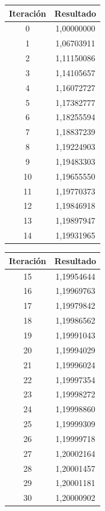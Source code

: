 \documentclass[titlepage,a4paper]{article}
\begin{document}
\begin{multicols}{2}
\begin{center}
    \begin{tabular}{| c | c |}
    \hline
     Iteración & Resultado \\ \hline
        0     & 1,00000000 \\
        1     & 1,06703911 \\
        2     & 1,11150086 \\
        3     & 1,14105657 \\
        4     & 1,16072727 \\
        5     & 1,17382777 \\
        6     & 1,18255594 \\
        7     & 1,18837239 \\
        8     & 1,19224903 \\
        9     & 1,19483303 \\
        10    & 1,19655550 \\
        11    & 1,19770373 \\
        12    & 1,19846918 \\
        13    & 1,19897947 \\
        14    & 1,19931965 \\
        
          \hline
    \end{tabular}
\end{center}
        
    \begin{center}
    \begin{tabular}{| c | c |}
    \hline    
     Iteración & Resultado \\ \hline
     15    & 1,19954644 \\
        16    & 1,19969763 \\
        17    & 1,19979842 \\
        18    & 1,19986562 \\
        19    & 1,19991043 \\
        20    & 1,19994029 \\
        21    & 1,19996024 \\
        22    & 1,19997354 \\
        23    & 1,19998272 \\
        24    & 1,19998860 \\
        25    & 1,19999309 \\
        26    & 1,19999718 \\
        27    & 1,20002164 \\
        28    & 1,20001457 \\
        29    & 1,20001181 \\
        30    & 1,20000902 \\
    \hline
    \end{tabular}
\end{center}
\end{multicols}
\end{document}
